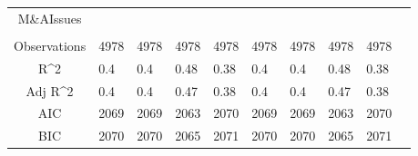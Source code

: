 \documentclass{article}
\begin{document}
\begin{table}[H]
\begin{tabular}{|clllllllll|}
  M\&AIssues &  &  &  &  &  &  &  &  & \\ 
   &  &  &  &  &  &  &  &  & \\ 
  \hline 
 Observations & 4978 & 4978 & 4978 & 4978 & 4978 & 4978 & 4978 & 4978 & \\ 
  R^2 & 0.4 & 0.4 & 0.48 & 0.38 & 0.4 & 0.4 & 0.48 & 0.38 & \\ 
  Adj R^2 & 0.4 & 0.4 & 0.47 & 0.38 & 0.4 & 0.4 & 0.47 & 0.38 & \\ 
  AIC & 2069 & 2069 & 2063 & 2070 & 2069 & 2069 & 2063 & 2070 & \\ 
  BIC & 2070 & 2070 & 2065 & 2071 & 2070 & 2070 & 2065 & 2071 & \\ 
   \hline
\end{tabular}
 
\end{table}
\end{document}
